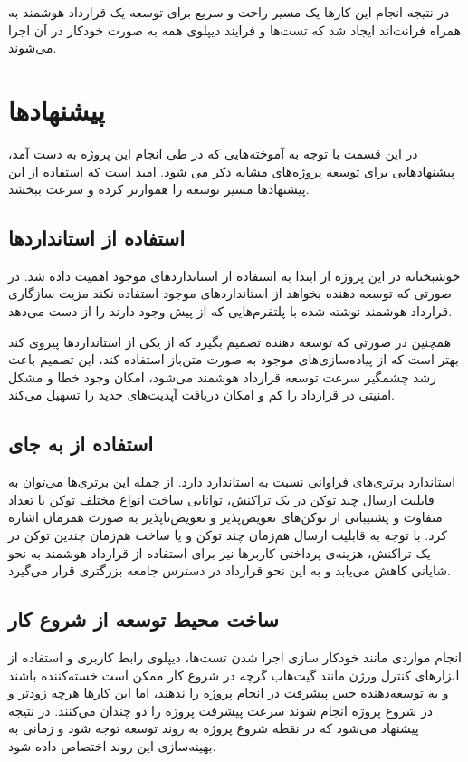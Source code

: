 در نتیجه انجام این کارها یک مسیر راحت و سریع برای توسعه یک قرارداد هوشمند به همراه فرانت‌اند ایجاد شد که تست‌ها و فرایند دیپلوی همه به صورت خودکار در آن اجرا می‌شوند.



\section{پیشنهادها}
در این قسمت با توجه به آموخته‌هایی که در طی انجام این پروژه به دست آمد،
پیشنهادهایی برای توسعه پروژه‌های مشابه ذکر می شود.
امید است که استفاده از این پیشنهادها مسیر توسعه را هموارتر کرده و سرعت ببخشد.

\subsection{استفاده از استانداردها}
خوشبختانه در این پروژه از ابتدا به استفاده از استانداردهای موجود اهمیت داده شد.
در صورتی که توسعه دهنده بخواهد از استانداردهای موجود استفاده نکند مزیت سازگاری
قرارداد هوشمند نوشته شده با پلتفرم‌هایی که از پیش وجود دارند را از دست می‌دهد.

همچنین در صورتی که توسعه دهنده تصمیم بگیرد که از یکی از استانداردها پیروی کند
بهتر است که از پیاده‌سازی‌های موجود به صورت متن‌باز استفاده کند، این تصمیم باعث
رشد چشمگیر سرعت توسعه قرارداد هوشمند می‌شود، امکان وجود خطا و مشکل امنیتی در قرارداد را کم
و امکان دریافت آپدیت‌های جدید را تسهیل می‌کند.


\subsection{استفاده از  به جای }
استاندارد
برتری‌های فراوانی نسبت به استاندارد
دارد.
از جمله این برتری‌ها می‌توان به قابلیت ارسال چند توکن در یک تراکنش،
توانایی ساخت انواع مختلف توکن با تعداد متفاوت و
پشتیبانی از توکن‌های تعویض‌پذیر و تعویض‌ناپذیر به صورت همزمان اشاره کرد.
با توجه به قابلیت ارسال هم‌زمان چند توکن و یا ساخت هم‌زمان چندین توکن در یک تراکنش، هزینه‌ی پرداختی کاربرها نیز
برای استفاده از قرارداد هوشمند به نحو شایانی کاهش می‌یابد و به این نحو قرارداد در دسترس
جامعه بزرگتری قرار می‌گیرد.

\subsection{ساخت محیط توسعه از شروع کار}
انجام مواردی مانند خودکار سازی اجرا شدن تست‌ها، دیپلوی رابط کاربری و استفاده از ابزارهای کنترل ورژن مانند گیت‌هاب
گرچه در شروع کار ممکن است خسته‌کننده باشند و به توسعه‌دهنده حس پیشرفت در انجام پروژه را ندهند، اما
این کارها هرچه زودتر و در شروع پروژه انجام شوند سرعت پیشرفت پروژه را دو چندان می‌کنند.
در نتیجه پیشنهاد می‌شود که در نقطه شروع پروژه به روند توسعه توجه شود و زمانی به
بهینه‌سازی این روند اختصاص داده شود.



